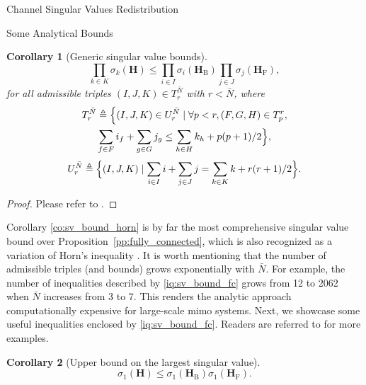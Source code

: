 \documentclass[journal]{IEEEtran}
\newtheorem{corollary}{Corollary}[proposition]
\begin{document}
\begin{section}{Channel Singular Values Redistribution}
\begin{subsection}{Some Analytical Bounds}
		\begin{corollary}[Generic singular value bounds\label{co:sv_bound_horn}]
			\begin{equation}
				\prod_{k \in {K}} \sigma_k(\mathbf{H}) \le \prod_{i \in {I}} \sigma_i(\mathbf{H}_\mathrm{B}) \prod_{j \in {J}} \sigma_j(\mathbf{H}_\mathrm{F}),
				\label{iq:sv_bound_fc}
			\end{equation}
			for all admissible triples $(I, J, K) \in T_r^{\bar{N}}$ with $r < \bar{N}$, where
			\begin{equation*}
				\begin{gathered}
					T_r^{\bar{N}} \triangleq \Bigl\{(I, J, K) \in U_r^{\bar{N}} \mid \forall p < r, (F, G, H) \in T_p^r,\\
					\sum_{f \in F} i_f + \sum_{g \in G} j_g \le \sum_{h \in H} k_h + p(p+1)/2 \Bigr\},
				\end{gathered}
			\end{equation*}
			\begin{equation*}
				U_r^{\bar{N}} \triangleq \Bigl\{(I, J, K) \mid \sum_{i \in I} i + \sum_{j \in J} j = \sum_{k \in K} k + r(r+1)/2\Bigr\}.
			\end{equation*}
		\end{corollary}

		\begin{proof}
			Please refer to \cite[Theorem~8]{Fulton2000}.
		\end{proof}

		Corollary \eqref{co:sv_bound_horn} is by far the most comprehensive singular value bound over Proposition~\ref{pp:fully_connected}, which is also recognized as a variation of Horn's inequality \cite{Bhatia2001}.
		It is worth mentioning that the number of admissible triples (and bounds) grows exponentially with $\bar{N}$.
		For example, the number of inequalities described by \eqref{iq:sv_bound_fc} grows from 12 to 2062 when $\bar{N}$ increases from 3 to 7.
		This renders the analytic approach computationally expensive for large-scale \gls{mimo} systems.
		Next, we showcase some useful inequalities enclosed by \eqref{iq:sv_bound_fc}.
		Readers are referred to \cite[Chapter 16, 24]{Hogben2013} for more examples.

		\begin{corollary}[Upper bound on the largest singular value\label{co:sv_largest}]
			\begin{equation}
				\sigma_1(\mathbf{H}) \le \sigma_1(\mathbf{H}_\mathrm{B}) \sigma_1(\mathbf{H}_\mathrm{F}).
			\end{equation}
		\end{corollary}


\end{subsection}
\end{section}
\end{document}
